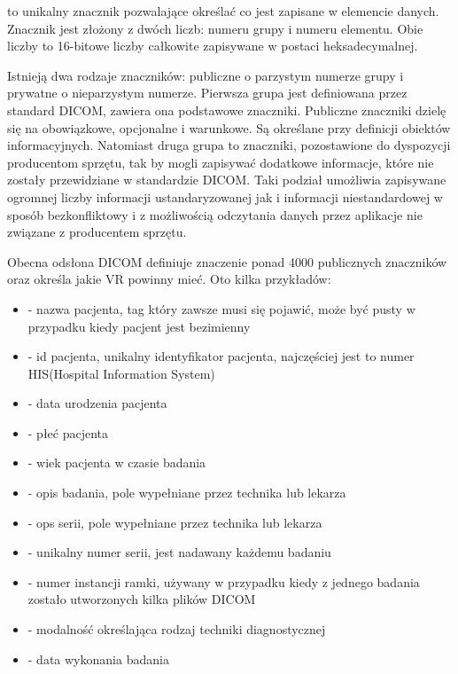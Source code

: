 \par
{} to unikalny znacznik pozwalające określać co jest zapisane w elemencie danych.
Znacznik jest złożony z dwóch liczb: numeru grupy i numeru elementu.
Obie liczby to 16-bitowe liczby całkowite zapisywane w postaci  heksadecymalnej.

\par
Istnieją dwa rodzaje znaczników: publiczne o parzystym numerze grupy i prywatne o nieparzystym numerze.
Pierwsza grupa jest definiowana przez standard DICOM, zawiera ona podstawowe znaczniki.
Publiczne znaczniki dzielę się na obowiązkowe, opcjonalne i warunkowe.
Są określane przy definicji obiektów informacyjnych.
Natomiast druga grupa to znaczniki, pozostawione do dyspozycji producentom sprzętu, tak by mogli zapisywać dodatkowe informacje, które nie zostały przewidziane w standardzie DICOM.
Taki podział umożliwia zapisywane ogromnej liczby informacji ustandaryzowanej jak i informacji niestandardowej w sposób bezkonfliktowy i z możliwością odczytania danych przez aplikacje nie związane z producentem sprzętu.

\par
Obecna odsłona DICOM definiuje znaczenie ponad 4000 publicznych znaczników oraz określa jakie VR powinny mieć.
Oto kilka przykładów:
\begin{itemize}
    \item {} - nazwa pacjenta, tag który zawsze musi się pojawić, może być pusty w przypadku kiedy pacjent jest bezimienny
    \item {} - id pacjenta, unikalny identyfikator pacjenta, najczęściej jest to numer HIS(Hospital Information System)
    \item {} - data urodzenia pacjenta
    \item {} - płeć pacjenta
    \item {} - wiek pacjenta w czasie badania
    \item {} - opis badania, pole wypełniane przez technika lub lekarza
    \item {} - ops serii, pole wypełniane przez technika lub lekarza
    \item {} - unikalny numer serii, jest nadawany każdemu badaniu
    \item {} - numer instancji ramki, używany w przypadku kiedy z jednego badania zostało utworzonych kilka plików DICOM
    \item {} - modalność określająca rodzaj techniki diagnostycznej
    \item {} - data wykonania badania
\end{itemize}



